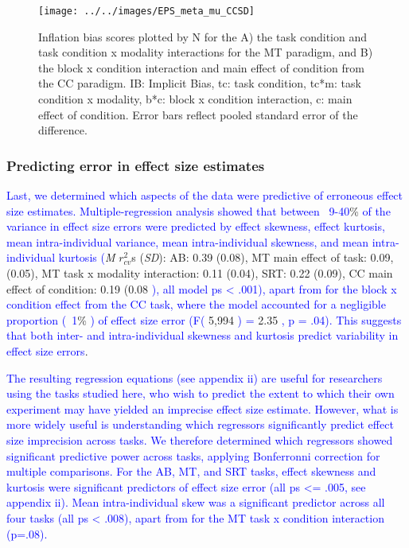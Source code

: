 \documentclass[
  man]{apa6}
\begin{document}
\begin{figure}

{\centering \texttt{[image: ../../images/EPS\_meta\_mu\_CCSD]} 

}

\caption{Inflation bias scores plotted by N for the A) the task condition and task condition x modality interactions for the MT paradigm, and B) the block x condition interaction and main effect of condition from the CC paradigm. IB: Implicit Bias, tc: task condition, tc*m: task condition x modality, b*c: block x condition interaction, c: main effect of condition. Error bars reflect pooled standard error of the difference.}\label{fig:infbias}
\end{figure}

\hypertarget{predicting-error-in-effect-size-estimates}{%
\subsubsection{Predicting error in effect size estimates}\label{predicting-error-in-effect-size-estimates}}

\textcolor{blue}{Last, we determined which aspects of the data were predictive of erroneous effect size estimates. Multiple-regression analysis showed that between ~9-40}\% \textcolor{blue}{of the variance in effect size errors were predicted by effect skewness, effect kurtosis, mean intra-individual variance, mean intra-individual skewness, and mean intra-individual kurtosis (}\emph{M} \(r_{cv}^2\)s (\emph{SD}): AB: 0.39 (0.08), MT main effect of task: 0.09, (0.05), MT task x modality interaction: 0.11 (0.04), SRT: 0.22 (0.09), CC main effect of condition: 0.19 (0.08 \textcolor{blue}{), all model ps < .001), apart from for the block x condition effect from the CC task, where the model accounted for a negligible proportion (~1}\% \textcolor{blue}{) of effect size error (F(} 5,994 \textcolor{blue}{) =} 2.35 \textcolor{blue}{, p = .04). This suggests that both inter- and intra-individual skewness and kurtosis predict variability in effect size errors}.

\textcolor{blue}{The resulting regression equations (see appendix ii) are useful for researchers using the tasks studied here, who wish to predict the extent to which their own experiment may have yielded an imprecise effect size estimate. However, what is more widely useful is understanding which regressors significantly predict effect size imprecision across tasks. We therefore determined which regressors showed significant predictive power across tasks, applying Bonferronni correction for multiple comparisons. For the AB, MT, and SRT tasks, effect skewness and kurtosis were significant predictors of effect size error (all ps <= .005, see appendix ii). Mean intra-individual skew was a significant predictor across all four tasks (all ps < .008), apart from for the MT task x condition interaction (p=.08).}
\end{document}
